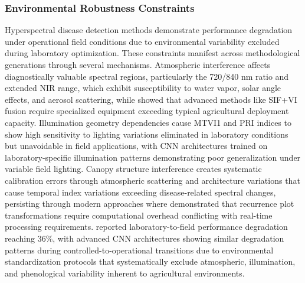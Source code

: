 \documentclass[sn-mathphys]{sn-jnl}
\theoremstyle{thmstyleone}%
\theoremstyle{thmstyletwo}%
\theoremstyle{thmstylethree}%
\begin{document}
\subsubsection{Environmental Robustness Constraints}
Hyperspectral disease detection methods demonstrate performance degradation under operational field conditions due to environmental variability excluded during laboratory optimization. These constraints manifest across methodological generations through several mechanisms. Atmospheric interference affects diagnostically valuable spectral regions, particularly the 720/840 nm ratio and extended NIR range, which exhibit susceptibility to water vapor, solar angle effects, and aerosol scattering, while \citet{song2025early} showed that advanced methods like SIF+VI fusion require specialized equipment exceeding typical agricultural deployment capacity. Illumination geometry dependencies cause MTVI1 and PRI indices to show high sensitivity to lighting variations eliminated in laboratory conditions but unavoidable in field applications, with CNN architectures trained on laboratory-specific illumination patterns demonstrating poor generalization under variable field lighting. Canopy structure interference creates systematic calibration errors through atmospheric scattering and architecture variations that cause temporal index variations exceeding disease-related spectral changes, persisting through modern approaches where \citet{tan2025early} demonstrated that recurrence plot transformations require computational overhead conflicting with real-time processing requirements. \citet{whetton2018hyperspectralP2} reported laboratory-to-field performance degradation reaching 36\%, with advanced CNN architectures showing similar degradation patterns during controlled-to-operational transitions due to environmental standardization protocols that systematically exclude atmospheric, illumination, and phenological variability inherent to agricultural environments.
\end{document}
